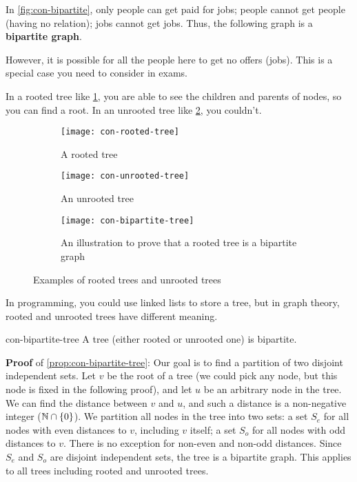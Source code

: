 \documentclass[../src/handouts/main.tex]{subfiles}
\begin{document}
In \cref{fig:con-bipartite}, only people can get paid for jobs; people cannot get people (having no relation); jobs cannot get jobs. Thus, the following graph is a \textbf{bipartite graph}.

However, it is possible for all the people here to get no offers (jobs). This is a special case you need to consider in exams.

In a rooted tree like \cref{fig:con-rooted-tree}, you are able to see the children and parents of nodes, so you can find a root. In an unrooted tree like \cref{fig:con-unrooted-tree}, you couldn't. %

\begin{figure}[htbp]
  \centering
  \begin{subfigure}[t]{.2\textwidth}
    \centering
    \texttt{[image: con-rooted-tree]}
    \caption{A rooted tree}
    \label{fig:con-rooted-tree}
  \end{subfigure}
  \hspace{.1\textwidth}
  \begin{subfigure}[t]{.2\textwidth}
    \centering
    \texttt{[image: con-unrooted-tree]}
    \caption{An unrooted tree}
    \label{fig:con-unrooted-tree}
  \end{subfigure}
  \hspace{.1\textwidth}
  \begin{subfigure}[t]{.3\textwidth}
    \centering
    \texttt{[image: con-bipartite-tree]}
    \caption{An illustration to prove that a rooted tree is a bipartite graph}
    \label{fig:con-bipartite-tree}
  \end{subfigure}
  \caption{Examples of rooted trees and unrooted trees}
  \label{fig:con-rooted-unrooted-trees}
\end{figure}

In programming, you could use linked lists to store a tree, but in graph theory, rooted and unrooted trees have different meaning.

\begin{proposition}{}{con-bipartite-tree}
  A tree (either rooted or unrooted one) is bipartite.
\end{proposition}

\textbf{Proof} of \cref{prop:con-bipartite-tree}:
Our goal is to find a partition of two disjoint independent sets.
Let $v$ be the root of a tree (we could pick any node, but this node is fixed in the following proof), and let $u$ be an arbitrary node in the tree.
We can find the distance between $v$ and $u$, and such a distance is a non-negative integer ($\mathbb{N} \cap \{ 0 \}$).
We partition all nodes in the tree into two sets: a set $S_e$ for all nodes with even distances to $v$, including $v$ itself; a set $S_o$ for all nodes with odd distances to $v$.
There is no exception for non-even and non-odd distances.
Since $S_e$ and $S_o$ are disjoint independent sets, the tree is a bipartite graph.
This applies to all trees including rooted and unrooted trees.
\end{document}
